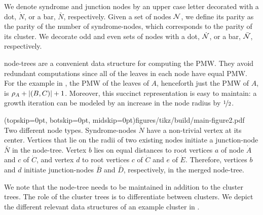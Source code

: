We denote syndrome and junction nodes by an upper case letter decorated with a dot, $\dot{N}$, or a bar, $\bar{N}$, respectively. Given a set of nodes $\mathcal{N}$, we define its parity as the parity of the number of syndrome-nodes, which corresponds to the parity of its cluster. We decorate odd and even sets of nodes with a dot, $\dot{\mathcal{N}}$, or a bar, $\bar{\mathcal{N}}$, respectively.


node-trees are a convenient data structure for computing the PMW. %
They avoid redundant computations since all of the leaves in each node have equal PMW. For the example in , the PMW of the leaves of $A$, henceforth just the PMW of $A$, is $\rho_A + \lvert(B,C)\rvert +1$. Moreover, this succinct representation is easy to maintain: a growth iteration can be modeled by an increase in the node radius by $\nicefrac{1}{2}$.

\Figure[bt](topskip=0pt, botskip=0pt, midskip=0pt){figures/tikz/build/main-figure2.pdf}{
Two different node types. Syndrome-nodes $\dot N$ have a non-trivial vertex at its center. Vertices that lie on the radii of two existing nodes initiate a junction-node $\bar{N}$ in the node-tree. Vertex $b$ lies on equal distances to root vertices $a$ of node $\dot{A}$ and $c$ of $\dot{C}$, and vertex $d$ to root vertices $c$ of $\dot{C}$ and $e$ of $\dot{E}$. Therefore, vertices $b$ and $d$ initiate junction-nodes $\bar{B}$ and $\bar{D}$, respectively, in the merged node-tree. \label{fig:nodes}}

We note that the node-tree needs to be maintained in addition to the cluster trees. The role of the cluster trees is to differentiate between clusters.
We depict the different relevant data structures %
of an example cluster in . %

